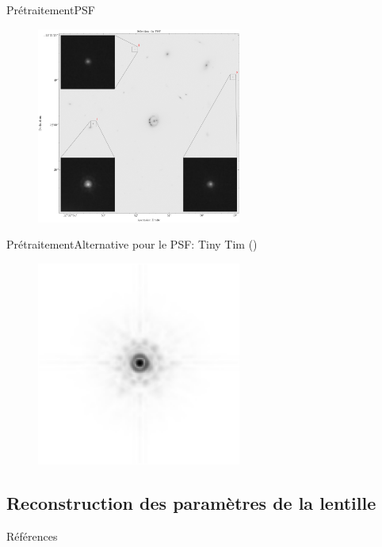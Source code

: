 \documentclass{beamer}
\begin{document}
\begin{frame}{Prétraitement}{PSF}
        \begin{figure}[H]
                \centering
                \includegraphics[width=0.6\textwidth]{psf_cutout}
        \end{figure}
\end{frame}

\begin{frame}{Prétraitement}{Alternative pour le PSF: Tiny Tim (\citet{Krist2011})}
        \begin{figure}[H]
                \centering
                \includegraphics[width=0.6\textwidth]{tiny_psf}
        \end{figure}
        
\end{frame}


\subsection{Reconstruction des paramètres de la lentille}


\begin{frame}[allowframebreaks]{Références}
        
        
\end{frame}
\end{document}
